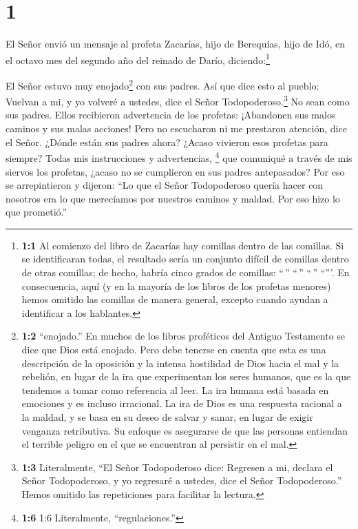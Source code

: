 \hypertarget{section}{%
\section{1}\label{section}}

 El Señor envió un mensaje al profeta Zacarías, hijo de
Berequías, hijo de Idó, en el octavo mes del segundo año del reinado de
Darío, diciendo:\footnote{\textbf{1:1} Al comienzo del libro de Zacarías
  hay comillas dentro de las comillas. Si se identificaran todas, el
  resultado sería un conjunto difícil de comillas dentro de otras
  comillas; de hecho, habría cinco grados de comillas: ``\,'' ``\,''
  ``\,'' ``'''. En consecuencia, aquí (y en la mayoría de los libros de
  los profetas menores) hemos omitido las comillas de manera general,
  excepto cuando ayudan a identificar a los hablantes.}

 El Señor estuvo muy enojado\footnote{\textbf{1:2}
  ``enojado.'' En muchos de los libros proféticos del Antiguo Testamento
  se dice que Dios está enojado. Pero debe tenerse en cuenta que esta es
  una descripción de la oposición y la intensa hostilidad de Dios hacia
  el mal y la rebelión, en lugar de la ira que experimentan los seres
  humanos, que es la que tendemos a tomar como referencia al leer. La
  ira humana está basada en emociones y es incluso irracional. La ira de
  Dios es una respuesta racional a la maldad, y se basa en su deseo de
  salvar y sanar, en lugar de exigir venganza retributiva. Su enfoque es
  asegurarse de que las personas entiendan el terrible peligro en el que
  se encuentran al persistir en el mal.} con sus padres. 
Así que dice esto al pueblo: Vuelvan a mi, y yo volveré a ustedes, dice
el Señor Todopoderoso.\footnote{\textbf{1:3} Literalmente, ``El Señor
  Todopoderoso dice: Regresen a mi, declara el Señor Todopoderoso, y yo
  regresaré a ustedes, dice el Señor Todopoderoso.'' Hemos omitido las
  repeticiones para facilitar la lectura.}  No sean como sus
padres. Ellos recibieron advertencia de los profetas: ¡Abandonen sus
malos caminos y sus malas acciones! Pero no escucharon ni me prestaron
atención, dice el Señor.  ¿Dónde están sus padres ahora?
¿Acaso vivieron esos profetas para siempre?  Todas mis
instrucciones y advertencias, \footnote{\textbf{1:6} 1:6 Literalmente,
  ``regulaciones.''} que comuniqué a través de mis siervos los profetas,
¿acaso no se cumplieron en sus padres antepasados? Por eso se
arrepintieron y dijeron: ``Lo que el Señor Todopoderoso quería hacer con
nosotros era lo que merecíamos por nuestros caminos y maldad. Por eso
hizo lo que prometió.''

